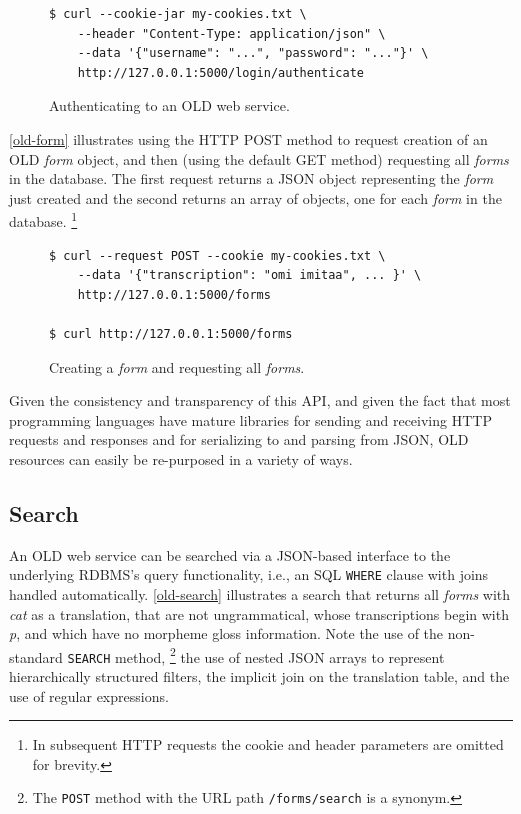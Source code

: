 \documentclass[11pt]{article}
\begin{document}
\begin{figure}[h]
\scriptsize
\begin{verbatim}
$ curl --cookie-jar my-cookies.txt \
    --header "Content-Type: application/json" \
    --data '{"username": "...", "password": "..."}' \
    http://127.0.0.1:5000/login/authenticate
\end{verbatim}
\normalsize
\caption{Authenticating to an OLD web service.}
\label{old-auth}
\end{figure}

\autoref{old-form} illustrates using the HTTP POST method to request creation
of an OLD \emph{form} object, and then (using the default GET method) requesting all
\emph{forms} in the database. The first request returns a JSON object representing the
\emph{form} just created and the second returns an array of objects, one for each \emph{form}
in the database.%
\footnote{In subsequent HTTP requests the cookie and header parameters are
omitted for brevity.}

\begin{figure}[h]
\scriptsize
\begin{verbatim}
$ curl --request POST --cookie my-cookies.txt \
    --data '{"transcription": "omi imitaa", ... }' \
    http://127.0.0.1:5000/forms

$ curl http://127.0.0.1:5000/forms
\end{verbatim}
\normalsize
\caption{Creating a \emph{form} and requesting all \emph{forms}.}
\label{old-form}
\end{figure}

Given the consistency and transparency of this API, and given the fact that
most programming languages have mature libraries for sending and receiving 
HTTP requests and responses and for serializing to and parsing from JSON, OLD
resources can easily be re-purposed in a variety of ways.


\subsection{Search}

An OLD web service can be searched via a JSON-based interface to the underlying
RDBMS's query functionality, i.e., an SQL \texttt{WHERE} clause with joins
handled automatically. \autoref{old-search} illustrates a search that returns
all \emph{forms} with \textit{cat} as a translation, that are not ungrammatical, whose
transcriptions begin with \textit{p}, and which have no morpheme gloss
information. Note the use of the non-standard \texttt{SEARCH} method,%
\footnote{The \texttt{POST} method with the URL path \texttt{/forms/search} is
a synonym.} %
the use of nested JSON arrays to represent hierarchically structured filters,
the implicit join on the translation table, and the use of regular expressions.
\end{document}
